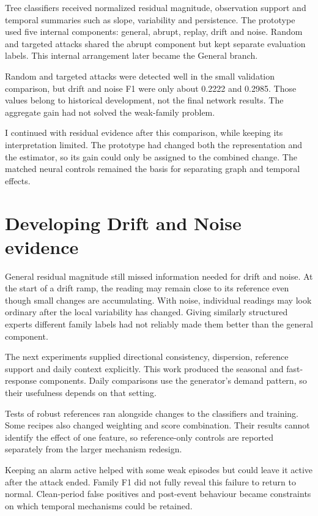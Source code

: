 Tree classifiers received normalized residual magnitude, observation support and temporal summaries such as slope, variability and persistence. The prototype used five internal components: general, abrupt, replay, drift and noise. Random and targeted attacks shared the abrupt component but kept separate evaluation labels. This internal arrangement later became the General branch.

Random and targeted attacks were detected well in the small validation comparison, but drift and noise F1 were only about 0.2222 and 0.2985. Those values belong to historical development, not the final network results. The aggregate gain had not solved the weak-family problem.

I continued with residual evidence after this comparison, while keeping its interpretation limited. The prototype had changed both the representation and the estimator, so its gain could only be assigned to the combined change. The matched neural controls remained the basis for separating graph and temporal effects.

\section{Developing Drift and Noise evidence}
General residual magnitude still missed information needed for drift and noise. At the start of a drift ramp, the reading may remain close to its reference even though small changes are accumulating. With noise, individual readings may look ordinary after the local variability has changed. Giving similarly structured experts different family labels had not reliably made them better than the general component.

The next experiments supplied directional consistency, dispersion, reference support and daily context explicitly. This work produced the seasonal and fast-response components. Daily comparisons use the generator's demand pattern, so their usefulness depends on that setting.

Tests of robust references ran alongside changes to the classifiers and training. Some recipes also changed weighting and score combination. Their results cannot identify the effect of one feature, so reference-only controls are reported separately from the larger mechanism redesign.

Keeping an alarm active helped with some weak episodes but could leave it active after the attack ended. Family F1 did not fully reveal this failure to return to normal. Clean-period false positives and post-event behaviour became constraints on which temporal mechanisms could be retained.

